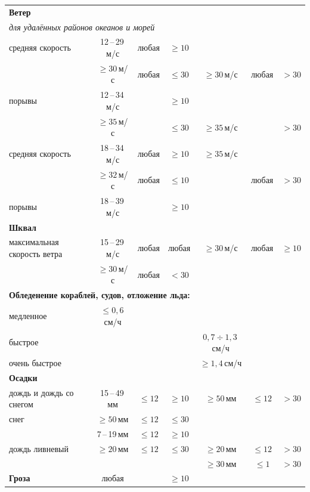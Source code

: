 \documentclass[a4paper, 12pt, twoside, final, book, russian, fittopage, cyremdash, openright]{ncc}
\newcommand{\mps}{\,м/с\xspace}
\newcommand{\otdo}{\,--\,}
\renewcommand{\le}{\leqslant}
\renewcommand{\ge}{\geqslant}
\begin{document}
\begin{longtable}{l|c|c|c|c|c|c}
  \multicolumn{7}{l}{\textbf{Ветер}} \\*
  \multicolumn{7}{l}{\textit{для удалённых районов океанов и морей}} \\*
  средняя скорость & 12\otdo29\mps & любая & $\ge10$  &               &       &        \\*
  {}               & $\ge30$\mps   & любая & $\le30$  & $\ge30$\mps   & любая & $>30$  \\
  порывы           & 12\otdo34\mps &       & $\ge10$  &               &       &        \\*
  {}               & $\ge35$\mps   &       & $\le30$  & $\ge35$\mps   &       & $>30$  \\
  \midrule
  средняя скорость & 18\otdo34\mps & любая & $\ge10$  & $\ge35$\mps   &       &        \\*
  {}               & $\ge32$\mps   & любая & $\le10$  &               & любая & $>30$  \\
  порывы           & 18\otdo39\mps &       & $\ge10$  &               &       &        \\
  \midrule

  \multicolumn{7}{l}{\textbf{Шквал}} \\*
  максимальная скорость ветра
  {}               & 15\otdo29\mps & любая & любая    & $\ge30$\mps   & любая &$\ge10$ \\*
  {}               & $\ge30$\mps   & любая & $<30$    &               &       &        \\ 
  \midrule

  \multicolumn{7}{l}{\textbf{Обледенение кораблей, судов, отложение льда:}} \\*
  медленное        & $\le0,6$\,см/ч &      &          &               &       &         \\
  \midrule
  быстрое          &               &       &          & $0,7\div1,3$\,см/ч &  &         \\
  \midrule
  очень быстрое    &               &       &          & $\ge1,4$\,см/ч &      &         \\
  \midrule

  \multicolumn{7}{l}{\textbf{Осадки}} \\*
  дождь и дождь со снегом & 15\otdo49\,мм & $\le12$ & $\ge10$ & $\ge50$\,мм & $\le12$ & $>30$ \\
  \midrule
  снег             & $\ge50$\,мм   & $\le12$ & $\le30$ &               &      &         \\*
  {}               & 7\otdo19\,мм  & $\le12$ & $\ge10$ &               &      &         \\
  \midrule
  дождь ливневый   & $\ge20$\,мм   & $\le12$ & $\le30$ & $\ge20$\,мм  & $\le12$ & $>30$ \\*
  {}               &               &         &         & $\ge30$\,мм   & $\le1$ & $>30$ \\
  \midrule
  \textbf{Гроза}   & любая         &         & $\ge10$ &               &      &         \\
  \midrule


\end{longtable}
\end{document}
